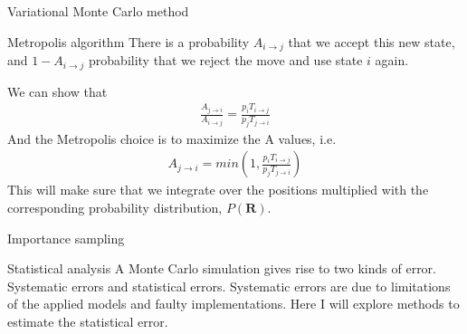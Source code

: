 \documentclass[a4paper, 12pt, titlepage]{article}
\begin{document}
\begin{section}{Variational Monte Carlo method}
\begin{subsection}{Metropolis algorithm}
 	There is a probability $A_{i\to j}$ that we accept this new state, and $1-A_{i \to j}$ probability that we reject the move and use state $i$ again. 

 	We can show that 
	\begin{align}
 		\frac{A_{j\to i}}{A_{i\to j}} = \frac{p_i T_{i\to j}}{p_j T_{j\to i}}	
 	\end{align}
 	And the Metropolis choice is to maximize the A values, i.e. 
 	\begin{align}
 		A_{j \to i} = min\left( 1, \frac{p_i T_{i\to j}}{p_j T_{j\to i}} \right)
 	\end{align}
 	This will make sure that we integrate over the positions multiplied with the corresponding probability distribution, $P(\mathbf{R})$. 

 \end{subsection}

 \begin{subsection}{Importance sampling}
 	
 \end{subsection}

 \begin{subsection}{Statistical analysis}
 	A Monte Carlo simulation gives rise to two kinds of error. Systematic errors and statistical errors. Systematic errors are due to limitations of the applied models and faulty implementations. Here I will explore methods to estimate the statistical error. 


\end{subsection}
\end{section}
\end{document}
